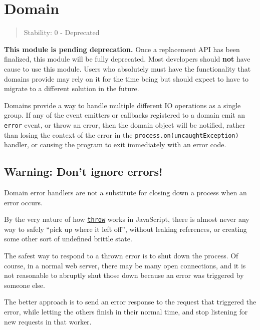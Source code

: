 \section{Domain}\label{domain}

\begin{quote}
Stability: 0 - Deprecated
\end{quote}

\textbf{This module is pending deprecation.} Once a replacement API has
been finalized, this module will be fully deprecated. Most developers
should \textbf{not} have cause to use this module. Users who absolutely
must have the functionality that domains provide may rely on it for the
time being but should expect to have to migrate to a different solution
in the future.

Domains provide a way to handle multiple different IO operations as a
single group. If any of the event emitters or callbacks registered to a
domain emit an \texttt{\textquotesingle{}error\textquotesingle{}} event,
or throw an error, then the domain object will be notified, rather than
losing the context of the error in the
\texttt{process.on(\textquotesingle{}uncaughtException\textquotesingle{})}
handler, or causing the program to exit immediately with an error code.

\subsection{Warning: Don't ignore
errors!}\label{warning-dont-ignore-errors}

Domain error handlers are not a substitute for closing down a process
when an error occurs.

By the very nature of how
\href{https://developer.mozilla.org/en-US/docs/Web/JavaScript/Reference/Statements/throw}{\texttt{throw}}
works in JavaScript, there is almost never any way to safely ``pick up
where it left off'', without leaking references, or creating some other
sort of undefined brittle state.

The safest way to respond to a thrown error is to shut down the process.
Of course, in a normal web server, there may be many open connections,
and it is not reasonable to abruptly shut those down because an error
was triggered by someone else.

The better approach is to send an error response to the request that
triggered the error, while letting the others finish in their normal
time, and stop listening for new requests in that worker.

